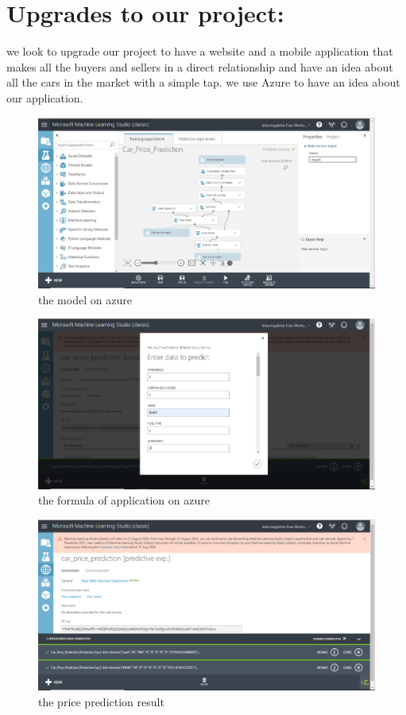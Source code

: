 \documentclass{article}
\begin{document}
\section{ Upgrades to our project:}
we look to upgrade our project to have a website and a mobile application that makes all the buyers and sellers in a direct relationship and have an idea about all the cars in the market with a simple tap.
we use Azure to have an idea about our application. \\
\begin{figure}[!h]
    \centering
    \includegraphics[width=1\textwidth]{azure1.png}
    \caption{the model on azure}
    \label{fig:my_label}
\end{figure}
\begin{figure}[!h]
    \centering
    \includegraphics[width=1\textwidth]{azure2.png}
    \caption{the formula of application on azure }
    \label{fig:my_label}
\end{figure}
\begin{figure}[!h]
    \centering
    \includegraphics[width=1\textwidth]{azure3.png}
    \caption{the price prediction result}
    \label{fig:my_label}
\end{figure}
\newpage
\end{document}
